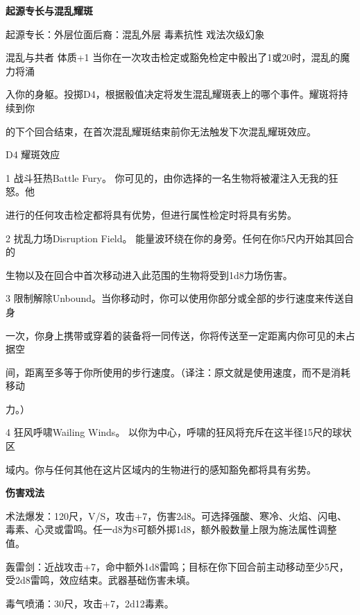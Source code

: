 \documentclass[letterpaper,openany,twoside,twocolumn]{book}
\begin{document}
\par\noindent\textbf{起源专长与混乱耀斑}\par
起源专长：外层位面后裔：混乱外层 毒素抗性 戏法次级幻象\par
混乱与共者 体质+1 当你在一次攻击检定或豁免检定中骰出了1或20时，混乱的魔力将涌\par
入你的身躯。投掷D4，根据骰值决定将发生混乱耀斑表上的哪个事件。耀斑将持续到你\par
的下个回合结束，在首次混乱耀斑结束前你无法触发下次混乱耀斑效应。\par
D4 耀斑效应\par
1 战斗狂热Battle Fury。 你可见的，由你选择的一名生物将被灌注入无我的狂怒。他\par
进行的任何攻击检定都将具有优势，但进行属性检定时将具有劣势。\par
2 扰乱力场Disruption Field。 能量波环绕在你的身旁。任何在你5尺内开始其回合的\par
生物以及在回合中首次移动进入此范围的生物将受到1d8力场伤害。\par
3 限制解除Unbound。当你移动时，你可以使用你部分或全部的步行速度来传送自身\par
一次，你身上携带或穿着的装备将一同传送，你将传送至一定距离内你可见的未占据空\par
间，距离至多等于你所使用的步行速度。（译注：原文就是使用速度，而不是消耗移动\par
力。）\par
4 狂风呼啸Wailing Winds。 以你为中心，呼啸的狂风将充斥在这半径15尺的球状区\par
域内。你与任何其他在这片区域内的生物进行的感知豁免都将具有劣势。\par


\par\noindent\textbf{伤害戏法}\par
术法爆发：120尺，V/S，攻击+7，伤害2d8。可选择强酸、寒冷、火焰、闪电、毒素、心灵或雷鸣。任一d8为8可额外掷1d8，额外骰数量上限为施法属性调整值。\par
轰雷剑：近战攻击+7，命中额外1d8雷鸣；目标在你下回合前主动移动至少5尺，受2d8雷鸣，效应结束。武器基础伤害未填。\par
毒气喷涌：30尺，攻击+7，2d12毒素。\par
\end{document}
